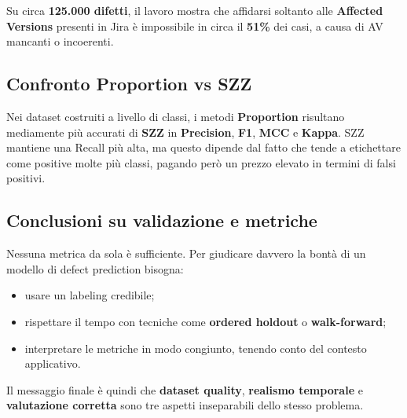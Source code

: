 Su circa \textbf{125.000 difetti}, il lavoro mostra che affidarsi soltanto alle \textbf{Affected Versions} presenti in Jira è impossibile in circa il \textbf{51\%} dei casi, a causa di AV mancanti o incoerenti.

\subsection{Confronto Proportion vs SZZ}

Nei dataset costruiti a livello di classi, i metodi \textbf{Proportion} risultano mediamente più accurati di \textbf{SZZ} in \textbf{Precision}, \textbf{F1}, \textbf{MCC} e \textbf{Kappa}. SZZ mantiene una Recall più alta, ma questo dipende dal fatto che tende a etichettare come positive molte più classi, pagando però un prezzo elevato in termini di falsi positivi.

\subsection{Conclusioni su validazione e metriche}

Nessuna metrica da sola è sufficiente. Per giudicare davvero la bontà di un modello di defect prediction bisogna:

\begin{itemize}
    \item usare un labeling credibile;
    \item rispettare il tempo con tecniche come \textbf{ordered holdout} o \textbf{walk-forward};
    \item interpretare le metriche in modo congiunto, tenendo conto del contesto applicativo.
\end{itemize}

Il messaggio finale è quindi che \textbf{dataset quality}, \textbf{realismo temporale} e \textbf{valutazione corretta} sono tre aspetti inseparabili dello stesso problema.